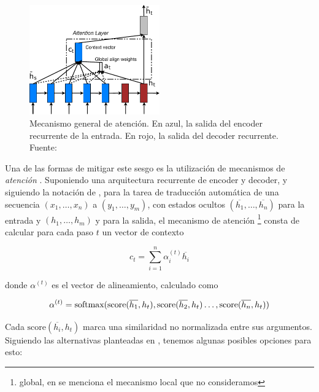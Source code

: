 \begin{figure}[t]
    \centering
    \includegraphics[width=0.5\textwidth]{img/02/attention_model.pdf}
    \caption{Mecanismo general de atención. En azul, la salida del encoder recurrente de la entrada. En rojo, la salida del decoder recurrente. Fuente: \citet{luong2015effective}}
    \label{fig:attention_mechanism}
\end{figure}


Una de las formas de mitigar este sesgo es la utilización de mecanismos de \emph{atención} \cite{bahdanau2014neural}. Suponiendo una arquitectura recurrente de encoder y decoder, y siguiendo la notación de \citet{luong2015effective}, para la tarea de traducción automática de una secuencia $(x_1, \ldots , x_n)$ a $(y_1, \ldots , y_m)$, con estados ocultos $(\overline{h_1}, \ldots , \overline{h_n})$ para la entrada y $(h_1, \ldots , h_m)$ y para la salida, el mecanismo de atención \footnote{global, en \citet{luong2015effective} se menciona el mecanismo local que no consideramos} consta de calcular para cada paso $t$ un vector de contexto

\begin{equation*}
    c_t = \sum_{i=1}^n \alpha_i^{(t)} \overline{h_i}
\end{equation*}

donde $\alpha^{(t)}$ es el vector de alineamiento, calculado como

\newcommand{\score}[0]{\text{score}}

\begin{equation*}
    \alpha^{(t)} = \softmax(\score(\overline{h_1}, h_t), \score(\overline{h_2}, h_t) \ldots , \score(\overline{h_n}, h_t))
\end{equation*}

Cada $\score(\overline{h_i}, h_t)$ marca una similaridad no normalizada entre sus argumentos. Siguiendo las alternativas planteadas en \citet{luong2015effective}, tenemos algunas posibles opciones para esto:

